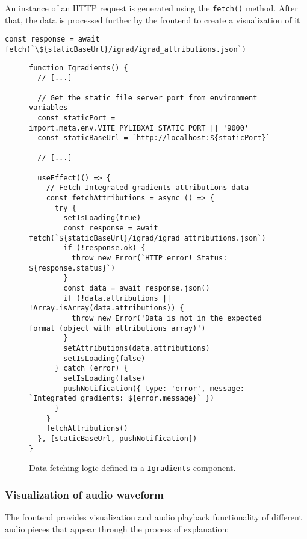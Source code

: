 \documentclass[
    bindingoffset=5mm,  %
    footnoteindent=3mm, %
    hyphenation=true    %
]{src/wut-thesis}
\begin{document}
An instance of an HTTP request is generated using the \texttt{fetch()} method. After that, the data is processed further by the frontend to create a visualization of it
\begin{verbatim}
const response = await fetch(`\${staticBaseUrl}/igrad/igrad_attributions.json`)
\end{verbatim}

\begin{figure}%
\begin{verbatim}
function Igradients() {
  // [...]

  // Get the static file server port from environment variables
  const staticPort = import.meta.env.VITE_PYLIBXAI_STATIC_PORT || '9000'
  const staticBaseUrl = `http://localhost:${staticPort}`

  // [...]

  useEffect(() => {
    // Fetch Integrated gradients attributions data
    const fetchAttributions = async () => {
      try {
        setIsLoading(true)
        const response = await fetch(`${staticBaseUrl}/igrad/igrad_attributions.json`)
        if (!response.ok) {
          throw new Error(`HTTP error! Status: ${response.status}`)
        }
        const data = await response.json()
        if (!data.attributions || !Array.isArray(data.attributions)) {
          throw new Error('Data is not in the expected format (object with attributions array)')
        }
        setAttributions(data.attributions)
        setIsLoading(false)
      } catch (error) {
        setIsLoading(false)
        pushNotification({ type: 'error', message: `Integrated gradients: ${error.message}` })
      }
    }
    fetchAttributions()
  }, [staticBaseUrl, pushNotification])
}
\end{verbatim}
\caption{Data fetching logic defined in a \texttt{Igradients} component.}
\label{fig:IgradComponentDataFetching}
\end{figure}
    
\subsubsection{Visualization of audio waveform}

The frontend provides visualization and audio playback functionality of
different audio pieces that appear through the process of explanation:
\end{document}
